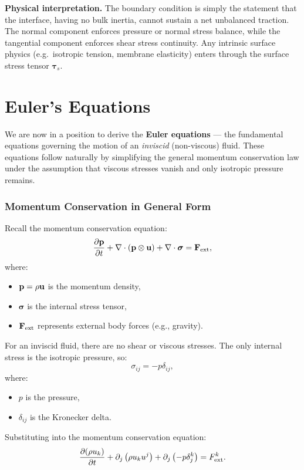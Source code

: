 \medskip
\noindent
\textbf{Physical interpretation.}  
The boundary condition is simply the statement that the interface, having no bulk inertia, 
cannot sustain a net unbalanced traction. The normal component enforces pressure or normal 
stress balance, while the tangential component enforces shear stress continuity. Any intrinsic 
surface physics (e.g.\ isotropic tension, membrane elasticity) enters through the surface stress 
tensor $\boldsymbol{\tau}_s$.


\section{Euler's Equations}

We are now in a position to derive the \textbf{Euler equations} — the fundamental equations governing the motion of an \emph{inviscid} (non-viscous) fluid. These equations follow naturally by simplifying the general momentum conservation law under the assumption that viscous stresses vanish and only isotropic pressure remains.

\vspace{0.25cm}
\subsubsection*{Momentum Conservation in General Form}

Recall the momentum conservation equation:
\[
\frac{\partial {\bf p}}{\partial t} + \nabla \cdot ({\bf p} \otimes {\bf u}) + \nabla \cdot \boldsymbol{\sigma} = {\bf F}_{\rm ext},
\]
where:
\begin{itemize}
    \item ${\bf p} = \rho {\bf u}$ is the momentum density,
    \item $\boldsymbol{\sigma}$ is the internal stress tensor,
    \item ${\bf F}_{\rm ext}$ represents external body forces (e.g., gravity).
\end{itemize}

For an inviscid fluid, there are no shear or viscous stresses. The only internal stress is the isotropic pressure, so:
\[
\sigma_{ij} = -p \delta_{ij},
\]
where:
\begin{itemize}
    \item $p$ is the pressure,
    \item $\delta_{ij}$ is the Kronecker delta.
\end{itemize}

Substituting into the momentum conservation equation:
\[
\frac{\partial (\rho u_k)}{\partial t} + \partial_j \left( \rho u_k u^j \right) + \partial_j \left( -p \delta^k_j \right) = F^k_{\rm ext}.
\]

